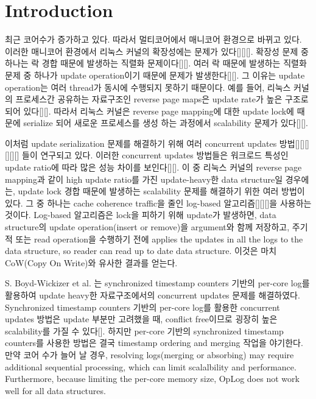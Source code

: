 \section{Introduction} \label{sec:introduction}

\ifkor
최근 코어수가 증가하고 있다. 따라서 멀티코어에서 매니코어 환경으로 바뀌고 있다. 
이러한 매니코어 환경에서 리눅스 커널의 확장성에는 문제가 있다[][][]. 
확장성 문제 중 하나는 락 경합 때문에 발생하는 직렬화 문제이다[][].
여러 락 때문에 발생하는 직렬화 문제 중 하나가 update operation이기 때문에 문제가 발생한다[][].
그 이유는 update operation는 여러 thread가 동시에 수행되지 못하기 때문이다.
예를 들어, 리눅스 커널의 프로세스간 공유하는 자료구조인 reverse page maps은 update rate가 높은 구조로 되어
있다[][]. 
따라서 리눅스 커널은 reverse page mapping에 대한 update lock에 때문에 serialize 되어 새로운 프로세스를
생성 하는 과정에서 scalability 문제가 있다[][].
\else

\fi


\ifkor
이처럼 update serialization 문제를 해결하기 위해 여러 concurrent updates 방법[][][][][][] 들이 연구되고 있다. 
이러한 concurrent updates 방법들은 워크로드 특성인 update ratio에 따라 많은 성능 차이를 보인다[][].
이 중 리눅스 커널의 reverse page mapping과 같이 high update ratio를 가진 update-heavy한 data
structure일 경우에는, update lock 경합 때문에 발생하는 scalability 문제를 해결하기 위한 여러 방법이 있다.
그 중 하나는 cache coherence traffic을 줄인 log-based 알고리즘[][][]을 사용하는 것이다.
Log-based 알고리즘은 lock을 피하기 위해 update가 발생하면, data structure의 update
operation(insert or remove)을 argument와 함께 저장하고, 주기적 또는 read operation을 수행하기 전에
applies the updates in all the logs to the data structure, so reader can read
up to date data structure. 이것은 마치 CoW(Copy On Write)와 유사한 결과를 얻는다. 

S. Boyd-Wickizer et al. 는 synchronized timestamp counters 기반의 per-core log를 활용하여
update heavy한 자료구조에서의 concurrent updates 문제를 해결하였다.
Synchronized timestamp counters 기반의 per-core log를 활용한 concurrent updates 방법은
update 부분만 고려했을 때, conflict free이므로 굉장히 높은 scalability를 가질 수 있다[]. 
하지만 per-core 기반의 synchronized timestamp counters를 사용한 방법은 결국 timestamp
ordering and merging 작업을 야기한다. 
만약 코어 수가 늘어 날 경우, resolving logs(merging or absorbing) may require
additional sequential processing, which can limit scalalbility and
performance.
Furthermore, because limiting the per-core memory size, OpLog does not work
well for all data structures.
\else


